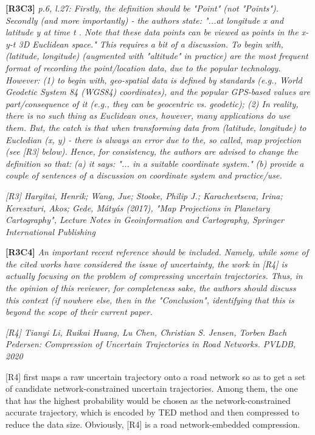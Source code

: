 \documentclass{letter}
\begin{document}
\textbf{[R3C3]} \emph{p.6, l.27: Firstly, the definition should be "Point" (not "Points"). Secondly (and more importantly) - the authors state: "...at longitude x and latitude y at time t . Note that these data points can be viewed as points in the x-y-t 3D Euclidean space." This requires a bit of a discussion. To begin with, (latitude, longitude) (augmented with "altitude" in practice) are the most frequent format of recording the point/location data, due to the popular technology. However: (1) to begin with, geo-spatial data is defined by standards (e.g., World Geodetic System 84 (WGS84) coordinates), and the popular GPS-based values are part/consequence of it (e.g., they can be geocentric vs. geodetic); (2) In reality, there is no such thing as Euclidean ones, however, many applications do use them. But, the catch is that when transforming data from (latitude, longitude) to Eucledian (x, y) - there is always an error due to the, so called, map projection (see [R3] below).}
%	
\emph{Hence, for consistency, the authors are advised to change the definition so that:}
%	
\emph{(a) it says: "... in a suitable coordinate system."}
%	
\emph{(b) provide a couple of sentences of a discussion on coordinate system and practice/use.}

\emph{[R3] Hargitai, Henrik; Wang, Jue; Stooke, Philip J.; Karachevtseva, Irina; Kereszturi, Akos; Gede, Mátyás (2017), "Map Projections in Planetary Cartography", Lecture Notes in Geoinformation and Cartography, Springer International Publishing}


\textbf{[R3C4]} \emph{An important recent reference should be included. Namely, while some of the cited works have considered the issue of uncertainty, the work in [R4] is actually focusing on the problem of compressing uncertain trajectories. Thus, in the opinion of this reviewer, for completeness sake, the authors should discuss this context (if nowhere else, then in the "Conclusion", identifying that this is beyond the scope of their current paper. }

\emph{[R4] Tianyi Li, Ruikai Huang, Lu Chen, Christian S. Jensen, Torben Bach Pedersen:
	Compression of Uncertain Trajectories in Road Networks. PVLDB, 2020}

[R4] first maps a raw uncertain trajectory onto a road network so as to get a set of candidate network-constrained uncertain trajectories. Among them, the one that has the highest probability would be chosen
as the network-constrained accurate trajectory, which is encoded by TED method and then compressed to reduce the data size. Obviously, [R4] is a road network-embedded compression. 
\end{document}
